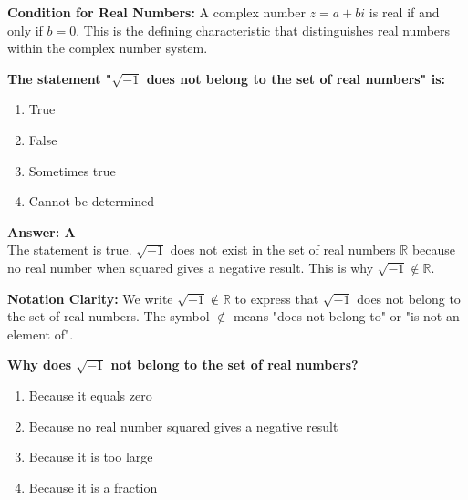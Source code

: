 \documentclass[12pt,a4paper]{article}
\begin{document}
\begin{conceptbox}
\textbf{Condition for Real Numbers:} A complex number \( z = a + bi \) is real if and only if \( b = 0 \). This is the defining characteristic that distinguishes real numbers within the complex number system.
\end{conceptbox}

\newpage
\begin{questiontitle}[MCQ 18]
\textbf{The statement "\( \sqrt{-1} \) does not belong to the set of real numbers" is:}
\end{questiontitle}

\begin{partbox}[Options]
\begin{enumerate}[label=\Alph*.]
    \item True
    \item False
    \item Sometimes true
    \item Cannot be determined
\end{enumerate}
\end{partbox}

\begin{answerstyle}
\textbf{Answer: A} \\
The statement is true. \( \sqrt{-1} \) does not exist in the set of real numbers \( \mathbb{R} \) because no real number when squared gives a negative result. This is why \( \sqrt{-1} \notin \mathbb{R} \).
\end{answerstyle}

\begin{conceptbox}
\textbf{Notation Clarity:} We write \( \sqrt{-1} \notin \mathbb{R} \) to express that \( \sqrt{-1} \) does not belong to the set of real numbers. The symbol \( \notin \) means "does not belong to" or "is not an element of".
\end{conceptbox}

\newpage
\begin{questiontitle}[MCQ 19]
\textbf{Why does \( \sqrt{-1} \) not belong to the set of real numbers?}
\end{questiontitle}

\begin{partbox}[Options]
\begin{enumerate}[label=\Alph*.]
    \item Because it equals zero
    \item Because no real number squared gives a negative result
    \item Because it is too large
    \item Because it is a fraction
\end{enumerate}
\end{partbox}
\end{document}
